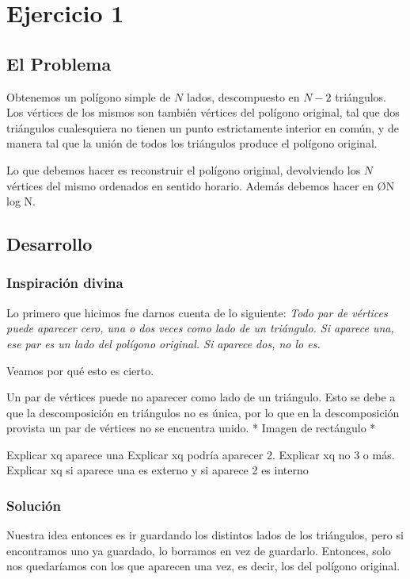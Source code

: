 \section{Ejercicio 1}
\subsection{El Problema}

Obtenemos un polígono simple de $N$ lados, descompuesto en $N - 2$ triángulos. Los vértices de los mismos son también vértices del polígono original, tal que dos triángulos cualesquiera no tienen un punto estrictamente interior en común, y de manera tal que la unión de todos los triángulos produce el polígono original. 

Lo que debemos hacer es reconstruir el polígono original, devolviendo  los $N$ vértices del mismo ordenados en sentido horario. Además debemos hacer en \O{N log N}.
\subsection{Desarrollo}
\subsubsection{Inspiración divina}

Lo primero que hicimos fue darnos cuenta de lo siguiente:
\textit{Todo par de vértices puede aparecer cero, una o dos veces como lado de un triángulo. Si aparece una, ese par es un lado del polígono original. Si aparece dos, no lo es.}

Veamos por qué esto es cierto. 

Un par de vértices puede no aparecer como lado de un triángulo. Esto se debe a que la descomposición en triángulos no es única, por lo que en la descomposición provista un par de vértices no se encuentra unido.
* Imagen de rectángulo *


Explicar xq aparece una
Explicar xq podría aparecer 2.
Explicar xq no 3 o más.
Explicar xq si aparece una es externo y si aparece 2 es interno

\subsubsection{Solución}
Nuestra idea entonces es ir guardando los distintos lados de los triángulos, pero si encontramos uno ya guardado, lo borramos en vez de guardarlo. Entonces, solo nos quedaríamos con los que aparecen una vez, es decir, los del polígono original.

